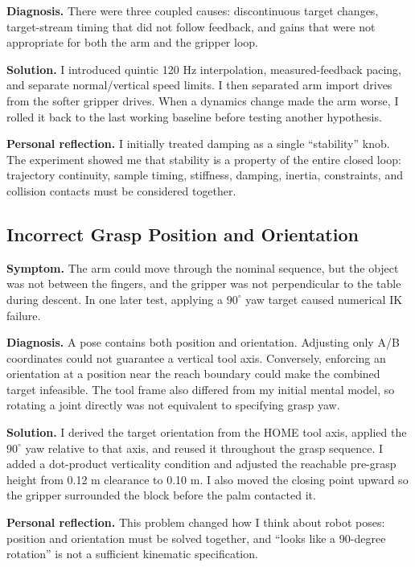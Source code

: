 \documentclass[UTF8,zihao=-4,scheme=chinese,fontset=none]{ctexart}
\begin{document}
\textbf{Diagnosis.} There were three coupled causes: discontinuous target changes, target-stream timing that did not follow feedback, and gains that were not appropriate for both the arm and the gripper loop.

\textbf{Solution.} I introduced quintic 120 Hz interpolation, measured-feedback pacing, and separate normal/vertical speed limits. I then separated arm import drives from the softer gripper drives. When a dynamics change made the arm worse, I rolled it back to the last working baseline before testing another hypothesis.

\textbf{Personal reflection.} I initially treated damping as a single ``stability'' knob. The experiment showed me that stability is a property of the entire closed loop: trajectory continuity, sample timing, stiffness, damping, inertia, constraints, and collision contacts must be considered together.

\subsection{Incorrect Grasp Position and Orientation}

\textbf{Symptom.} The arm could move through the nominal sequence, but the object was not between the fingers, and the gripper was not perpendicular to the table during descent. In one later test, applying a $90^{\circ}$ yaw target caused numerical IK failure.

\textbf{Diagnosis.} A pose contains both position and orientation. Adjusting only A/B coordinates could not guarantee a vertical tool axis. Conversely, enforcing an orientation at a position near the reach boundary could make the combined target infeasible. The tool frame also differed from my initial mental model, so rotating a joint directly was not equivalent to specifying grasp yaw.

\textbf{Solution.} I derived the target orientation from the HOME tool axis, applied the $90^{\circ}$ yaw relative to that axis, and reused it throughout the grasp sequence. I added a dot-product verticality condition and adjusted the reachable pre-grasp height from 0.12 m clearance to 0.10 m. I also moved the closing point upward so the gripper surrounded the block before the palm contacted it.

\textbf{Personal reflection.} This problem changed how I think about robot poses: position and orientation must be solved together, and ``looks like a 90-degree rotation'' is not a sufficient kinematic specification.
\end{document}

